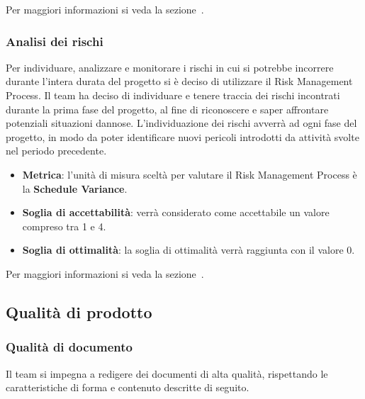 Per maggiori informazioni si veda la sezione~.

\subsubsection{Analisi dei rischi}
Per individuare, analizzare e monitorare i rischi in cui si potrebbe incorrere durante l’intera durata del progetto si è deciso di utilizzare il Risk Management Process.
Il team ha deciso di individuare e tenere traccia dei rischi incontrati durante la prima fase del progetto, al fine di riconoscere e saper affrontare potenziali situazioni dannose.
L'individuazione dei rischi avverrà ad ogni fase del progetto, in modo da poter identificare nuovi pericoli introdotti da attività svolte nel periodo precedente.
\begin{itemize}
	\item \textbf{Metrica}: l'unità di misura sceltà per valutare il Risk Management Process è la \textbf{Schedule Variance}.
	\item \textbf{Soglia di accettabilità}: verrà considerato come accettabile un valore compreso tra 1 e 4.
	\item \textbf{Soglia di ottimalità}: la soglia di ottimalità verrà raggiunta con il valore 0.
\end{itemize}

Per maggiori informazioni si veda la sezione~.

\subsection{Qualità di prodotto}
\subsubsection{Qualità di documento}
Il team si impegna a redigere dei documenti di alta qualità, rispettando le caratteristiche di forma e contenuto descritte di seguito.
